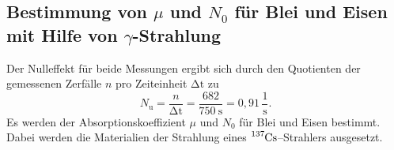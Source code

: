 \subsection{Bestimmung von \texorpdfstring{$\mu$}{Absorptionskoeffizient} und \texorpdfstring{$N_0$}{Anfangswert} für Blei und Eisen mit Hilfe von \texorpdfstring{$\gamma$}{Gamma}-Strahlung}
Der Nulleffekt für beide Messungen ergibt sich durch den Quotienten der gemessenen Zerfälle $n$ pro Zeiteinheit ${\mathup{\Delta{t}}}$ zu
\begin{equation}
N_\mathup{u}=\frac{n}{\mathup{\Delta{t}}}=\frac{682}{\SI{750}{\second}}=0,91\,\frac{1}{\si\second}.
\label{eq:N_u}
\end{equation}
Es werden der Absorptionskoeffizient $\mu$ und $N_0$ für Blei und Eisen bestimmt. Dabei werden die Materialien der Strahlung eines $\ce{^{137}Cs}$--Strahlers ausgesetzt. 
